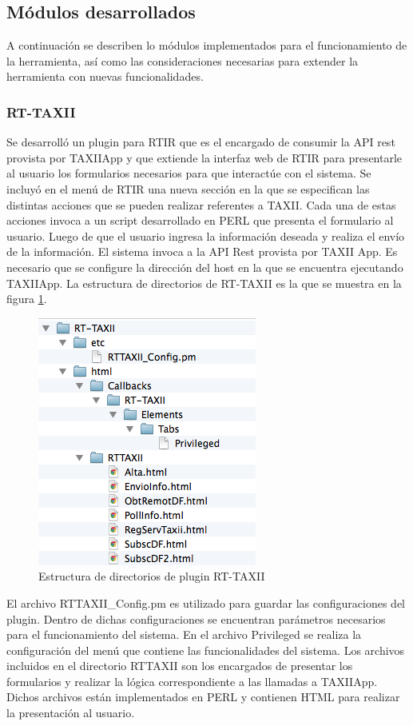 \subsection{Módulos desarrollados}
A continuación se describen lo módulos implementados para el funcionamiento de la herramienta, así como las consideraciones necesarias para extender la herramienta con nuevas funcionalidades.

\subsubsection{RT-TAXII}
Se desarrolló un plugin para RTIR que es el encargado de consumir la API rest provista por TAXIIApp y que extiende la interfaz web de RTIR para presentarle al usuario los formularios necesarios para que interactúe con el sistema.
Se incluyó en el menú de RTIR una nueva sección en la que se especifican las distintas acciones que se pueden realizar referentes a TAXII.
Cada una de estas acciones invoca a un script desarrollado en PERL que presenta el formulario al usuario.
Luego de que el usuario ingresa la información deseada y realiza el envío de la información. El sistema invoca a la API Rest provista por TAXII App.
Es necesario que se configure la dirección del host en la que se encuentra ejecutando TAXIIApp.
La estructura de directorios de RT-TAXII es la que se muestra en la figura \ref{fig.rt_taxii}.\\

\begin{figure}[H]
	\centering
	\includegraphics{imagenes/RT-TAXII.png}
	\caption{Estructura de directorios de plugin RT-TAXII}
	\label{fig.rt_taxii}
\end{figure}
	\bigskip
El archivo RTTAXII\_Config.pm es utilizado para guardar las configuraciones del plugin. Dentro de dichas configuraciones se encuentran parámetros necesarios para el funcionamiento del sistema.
En el archivo Privileged se realiza la configuración del menú que contiene las funcionalidades del sistema.
Los archivos incluidos en el directorio RTTAXII son los encargados de presentar los formularios y realizar la lógica correspondiente a las llamadas a TAXIIApp. Dichos archivos están implementados en PERL y contienen HTML para realizar la presentación al usuario.\\

